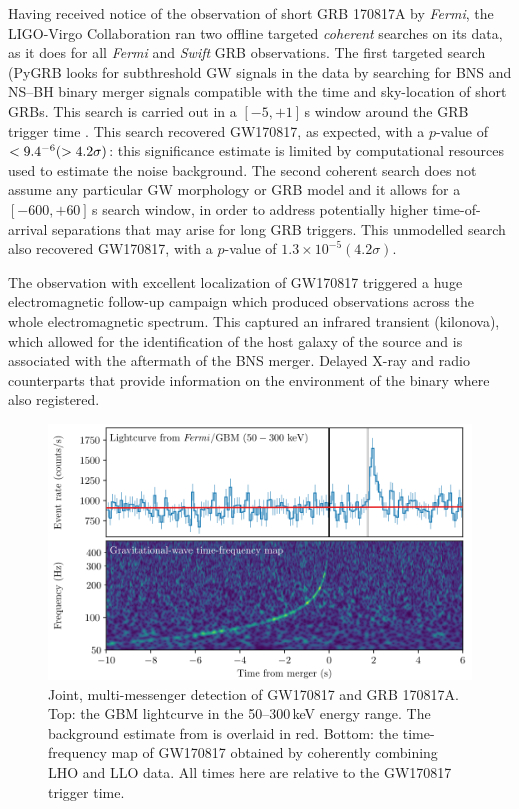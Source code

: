 \documentclass[binding=0.6cm, LaM]{sapthesis}
\begin{document}
        Having received notice of the observation of short GRB 170817A by {\it Fermi}, 
	the LIGO-Virgo Collaboration ran two offline targeted {\it coherent} searches on its data, 
	as it does for all {\it Fermi} and {\it Swift} GRB observations.  
	The first targeted search ({\ttfamily PyGRB} \cite{111,116,213}
	looks for subthreshold GW signals in the data by searching for BNS and NS–BH binary merger signals 
	compatible with the time and sky-location of short GRBs.  
	This search is carried out in a $[-5, +1]\,$s window around the GRB trigger time \cite{55}. 
	This search recovered GW170817, as expected, with a $p$-value of $<9.4\time 10^{-6}(>4.2\sigma)$: 
	this significance estimate is limited by computational resources used to estimate the noise background. 
	The second coherent search does not assume any particular GW morphology or GRB model 
	\cite{55,144,145} and it allows for a $[-600, +60]\,$s search window,
	in order to address potentially higher time-of-arrival separations 
	that may arise for long GRB triggers.
	This unmodelled search also recovered GW170817, with a $p$-value of $1.3\times 10^{-5} (4.2\sigma)$.

	The observation with excellent localization of GW170817 triggered 
	a huge electromagnetic follow-up campaign \cite{194} 
	which produced observations across the whole electromagnetic spectrum.
	This captured an infrared transient (kilonova), 
	which allowed for the identification of the host galaxy of the source 
	and is associated with the aftermath of the BNS merger.
	Delayed X-ray and radio counterparts that provide information 
	on the environment of the binary where also registered.
        
        \begin{figure}[!t]
          \label{gw-grb}
          \includegraphics[scale=0.45]{gw-grb}
          \centering
          \caption{Joint, multi-messenger detection of GW170817 and GRB 170817A. Top: the GBM lightcurve in the 50--300\,keV energy range. The background estimate from \cite{110} is overlaid in red. Bottom: the time-frequency map of GW170817  obtained by coherently combining LHO and LLO data. All times here are relative to the GW170817 trigger time. \cite{55}}
          \label{fig:gw-grb}
        \end{figure}
\end{document}
